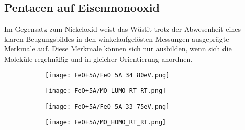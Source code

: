         \FloatBarrier
        \subsection{Pentacen auf Eisenmonooxid}
            Im Gegensatz zum Nickeloxid weist das Wüstit trotz der Abwesenheit eines klaren Beugungsbildes in den winkelaufgelösten Messungen ausgeprägte Merkmale auf.
            Diese Merkmale können sich nur ausbilden, wenn sich die Moleküle regelmäßig und in gleicher Orientierung anordnen.
            \begin{figure}
                \centering
                \begin{subfigure}[t]{0.48\textwidth}
                    \centering
                    \texttt{[image: FeO+5A/FeO\_5A\_34\_80eV.png]}
                    \label{fig:MOT_FeO+5A_exp_1}
                \end{subfigure}
                \begin{subfigure}[t]{0.48\textwidth}
                    \centering
                    \texttt{[image: FeO+5A/MO\_LUMO\_RT\_RT.png]}
                    \label{fig:MOT_FeO+5A_theo_1}
                \end{subfigure}
                \centering
                \begin{subfigure}[t]{0.48\textwidth}
                    \centering
                    \texttt{[image: FeO+5A/FeO\_5A\_33\_75eV.png]}
                    \label{fig:MOT_FeO+5A_exp_2}
                \end{subfigure}
                \begin{subfigure}[t]{0.48\textwidth}
                    \centering
                    \texttt{[image: FeO+5A/MO\_HOMO\_RT\_RT.png]}
                    \label{fig:MOT_FeO+5A_theo_2}
                \end{subfigure}

\end{figure}
